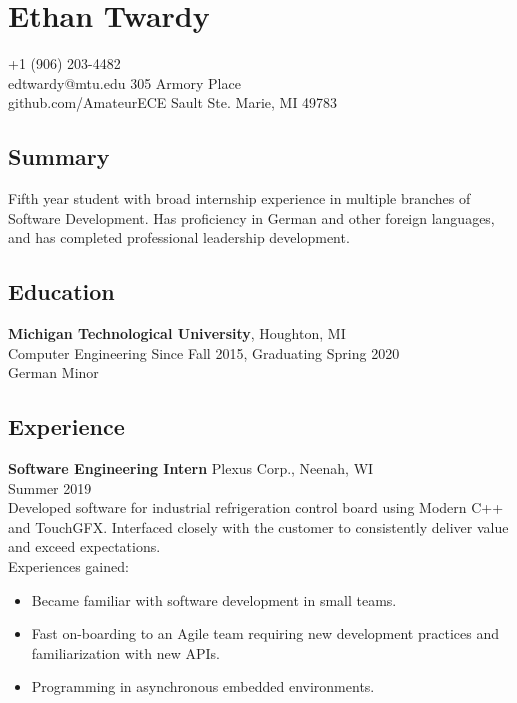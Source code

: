 \documentclass[11pt]{article}
\begin{document}
\section*{Ethan Twardy}
+1 (906) 203-4482\\
edtwardy@mtu.edu
\hfill
305 Armory Place\\
github.com/AmateurECE
\hfill
Sault Ste. Marie, MI 49783

\hrulefill

{
  \titlespacing{\subsection}{0pt}{0pt}{0pt}
  \subsection*{Summary}
  Fifth year student with broad internship experience in  multiple branches of
  Software Development. Has proficiency in German and other foreign languages,
  and has completed professional leadership development.
}

\subsection*{Education}
\textbf{Michigan Technological University}, Houghton, MI\\
Computer Engineering
\hfill
Since Fall 2015, Graduating Spring 2020\\
German Minor

\subsection*{Experience}
\textbf{Software Engineering Intern}
\hfill
Plexus Corp., Neenah, WI\\
Summer 2019\\
Developed software for industrial refrigeration control board using Modern C++
and TouchGFX. Interfaced closely with the customer to consistently deliver
value and exceed expectations.\\
Experiences gained:
\begin{itemize}
\item Became familiar with software development in small teams.
\item Fast on-boarding to an Agile team requiring new development practices and
  familiarization with new APIs.
\item Programming in asynchronous embedded environments.
\end{itemize}
\end{document}
